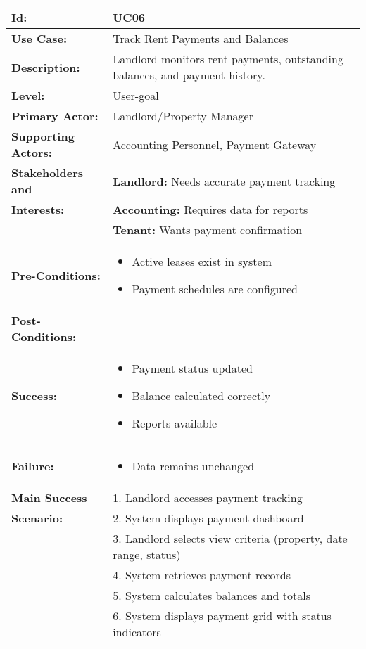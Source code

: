 \documentclass[12pt]{article}
\begin{document}
\begin{tabular}{|p{3cm}|p{11cm}|}
\hline
\textbf{Id:} & UC06 \\
\hline
\textbf{Use Case:} & Track Rent Payments and Balances \\
\hline
\textbf{Description:} & Landlord monitors rent payments, outstanding balances, and payment history. \\
\hline
\textbf{Level:} & User-goal \\
\hline
\textbf{Primary Actor:} & Landlord/Property Manager \\
\hline
\textbf{Supporting Actors:} & Accounting Personnel, Payment Gateway \\
\hline
\textbf{Stakeholders and} & \textbf{Landlord:} Needs accurate payment tracking \\
\textbf{Interests:} & \textbf{Accounting:} Requires data for reports \\
& \textbf{Tenant:} Wants payment confirmation \\
\hline
\textbf{Pre-Conditions:} & 
\begin{itemize}
    \item Active leases exist in system
    \item Payment schedules are configured
\end{itemize} \\
\hline
\textbf{Post-Conditions:} & \\
\textbf{Success:} & 
\begin{itemize}
    \item Payment status updated
    \item Balance calculated correctly
    \item Reports available
\end{itemize} \\
\textbf{Failure:} & 
\begin{itemize}
    \item Data remains unchanged
\end{itemize} \\
\hline
\textbf{Main Success} & 1. Landlord accesses payment tracking \\
\textbf{Scenario:} & 2. System displays payment dashboard \\
& 3. Landlord selects view criteria (property, date range, status) \\
& 4. System retrieves payment records \\
& 5. System calculates balances and totals \\
& 6. System displays payment grid with status indicators \\

\end{tabular}
\end{document}
